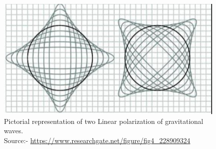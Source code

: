 \begin{figure}[h]
    \centering
    \includegraphics[scale=0.4]{images.tex/polarization.jpeg}
    \caption{Pictorial representation of two Linear polarization of gravitational waves. \\ Source:- \url{https://www.researchgate.net/figure/fig4_228909324}}
\end{figure}

\pagebreak
